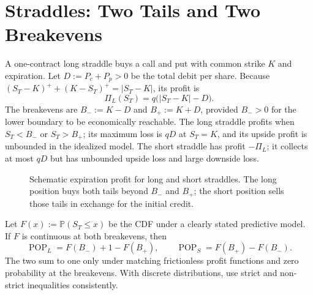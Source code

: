 \documentclass[11pt]{article}
\begin{document}
\section{Straddles: Two Tails and Two Breakevens}

A one-contract long straddle buys a call and put with common strike $K$ and expiration. Let $D:=P_c+P_p>0$ be the total debit per share. Because $(S_T-K)^++(K-S_T)^+=|S_T-K|$, its profit is
\begin{equation}
  \label{eq:straddle-profit}
  \Pi_L(S_T)=q\bigl(|S_T-K|-D\bigr).
\end{equation}
The breakevens are $B_-:=K-D$ and $B_+:=K+D$, provided $B_->0$ for the lower boundary to be economically reachable. The long straddle profits when $S_T<B_-$ or $S_T>B_+$; its maximum loss is $qD$ at $S_T=K$, and its upside profit is unbounded in the idealized model. The short straddle has profit $-\Pi_L$; it collects at most $qD$ but has unbounded upside loss and large downside loss.

\begin{figure}[ht]
  \centering
  \caption{Schematic expiration profit for long and short straddles. The long position buys both tails beyond $B_-$ and $B_+$; the short position sells those tails in exchange for the initial credit.}
  \label{fig:straddle-profit}
\end{figure}

Let $F(x):=\mathbb P(S_T\leq x)$ be the CDF under a clearly stated predictive model. If $F$ is continuous at both breakevens, then
\begin{equation}
  \label{eq:straddle-pop}
  \operatorname{POP}_{L}=F(B_-)+1-F(B_+),
  \qquad
  \operatorname{POP}_{S}=F(B_+)-F(B_-).
\end{equation}
The two sum to one only under matching frictionless profit functions and zero probability at the breakevens. With discrete distributions, use strict and non-strict inequalities consistently.
\end{document}
